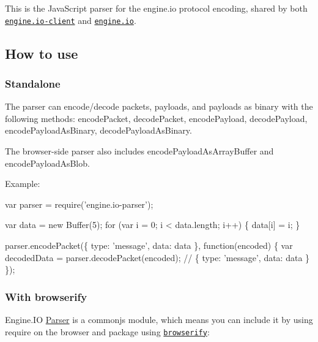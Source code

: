 \href{http://travis-ci.org/socketio/engine.io-parser}{\tt } \href{http://badge.fury.io/js/engine.io-parser}{\tt }

This is the Java\+Script parser for the engine.\+io protocol encoding, shared by both \href{https://github.com/socketio/engine.io-client}{\tt engine.\+io-\/client} and \href{https://github.com/socketio/engine.io}{\tt engine.\+io}.

\subsection*{How to use}

\subsubsection*{Standalone}

The parser can encode/decode packets, payloads, and payloads as binary with the following methods\+: {\ttfamily encode\+Packet}, {\ttfamily decode\+Packet}, {\ttfamily encode\+Payload}, {\ttfamily decode\+Payload}, {\ttfamily encode\+Payload\+As\+Binary}, {\ttfamily decode\+Payload\+As\+Binary}.

The browser-\/side parser also includes {\ttfamily encode\+Payload\+As\+Array\+Buffer} and {\ttfamily encode\+Payload\+As\+Blob}.

Example\+:


\begin{DoxyCode}
var parser = require('engine.io-parser');

var data = new Buffer(5);
for (var i = 0; i < data.length; i++) \{ data[i] = i; \}

parser.encodePacket(\{ type: 'message', data: data \}, function(encoded) \{
  var decodedData = parser.decodePacket(encoded); // \{ type: 'message', data: data \}
\});
\end{DoxyCode}


\subsubsection*{With browserify}

Engine.\+IO \mbox{\hyperlink{class_parser}{Parser}} is a commonjs module, which means you can include it by using {\ttfamily require} on the browser and package using \href{http://browserify.org/}{\tt browserify}\+:


